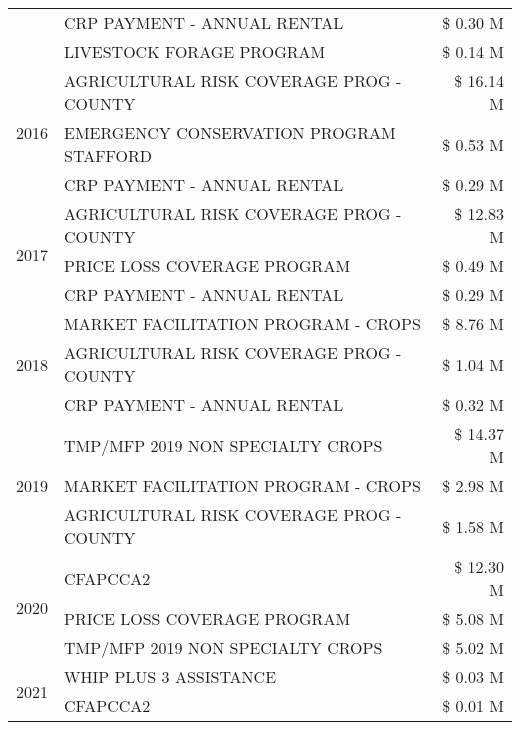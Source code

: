 \begin{tabular}{llr}
 & CRP PAYMENT - ANNUAL RENTAL & \$ 0.30 M \\
 & LIVESTOCK FORAGE PROGRAM & \$ 0.14 M \\
\cline{1-3}
\multirow[t]{3}{*}{2016} & AGRICULTURAL RISK COVERAGE PROG - COUNTY & \$ 16.14 M \\
 & EMERGENCY CONSERVATION PROGRAM STAFFORD & \$ 0.53 M \\
 & CRP PAYMENT - ANNUAL RENTAL & \$ 0.29 M \\
\cline{1-3}
\multirow[t]{3}{*}{2017} & AGRICULTURAL RISK COVERAGE PROG - COUNTY & \$ 12.83 M \\
 & PRICE LOSS COVERAGE PROGRAM & \$ 0.49 M \\
 & CRP PAYMENT - ANNUAL RENTAL & \$ 0.29 M \\
\cline{1-3}
\multirow[t]{3}{*}{2018} & MARKET FACILITATION PROGRAM - CROPS & \$ 8.76 M \\
 & AGRICULTURAL RISK COVERAGE PROG - COUNTY & \$ 1.04 M \\
 & CRP PAYMENT - ANNUAL RENTAL & \$ 0.32 M \\
\cline{1-3}
\multirow[t]{3}{*}{2019} & TMP/MFP 2019 NON SPECIALTY CROPS & \$ 14.37 M \\
 & MARKET FACILITATION PROGRAM - CROPS & \$ 2.98 M \\
 & AGRICULTURAL RISK COVERAGE PROG - COUNTY & \$ 1.58 M \\
\cline{1-3}
\multirow[t]{3}{*}{2020} & CFAPCCA2 & \$ 12.30 M \\
 & PRICE LOSS COVERAGE PROGRAM & \$ 5.08 M \\
 & TMP/MFP 2019 NON SPECIALTY CROPS & \$ 5.02 M \\
\cline{1-3}
\multirow[t]{2}{*}{2021} & WHIP PLUS 3 ASSISTANCE & \$ 0.03 M \\
 & CFAPCCA2 & \$ 0.01 M \\
\cline{1-3}
\bottomrule
\end{tabular}

